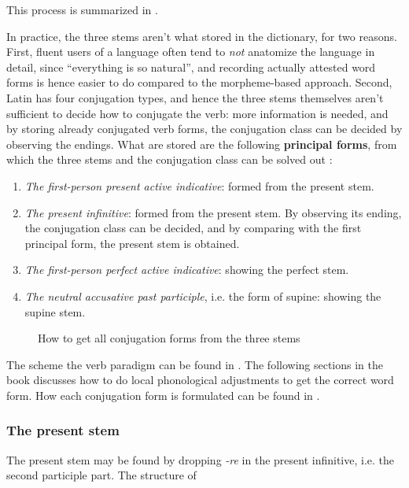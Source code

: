 \documentclass{article}
\newcommand*{\citesec}[1]{\S~{#1}}
\newcommand*{\concept}[1]{\textbf{#1}}
\newcommand*{\corpus}[1]{\emph{#1}}
\begin{document}
This process is summarized in .

In practice, the three stems aren't what stored in the dictionary,
for two reasons.
First, fluent users of a language often 
tend to \emph{not} anatomize the language in detail,
since ``everything is so natural'', 
and recording actually attested word forms is hence easier to do
compared to the morpheme-based approach.
Second, Latin has four conjugation types,
and hence the three stems themselves aren't sufficient to decide how to conjugate the verb:
more information is needed, 
and by storing already conjugated verb forms,
the conjugation class can be decided by observing the endings.
What are stored are the following \concept{principal forms},
from which the three stems and the conjugation class can be solved out
\citep[\citesec{172}]{allen1903allen}:
\begin{enumerate}
    \item \emph{The first-person present active indicative}: formed from the present stem.
    \item \emph{The present infinitive}: formed from the present stem. 
    By observing its ending, the conjugation class can be decided,
    and by comparing with the first principal form, 
    the present stem is obtained.
    \item \emph{The first-person perfect active indicative}: showing the perfect stem.
    \item \emph{The neutral accusative past participle}, i.e. the form of supine: showing the supine stem.
\end{enumerate}

\begin{sidewaysfigure}
    \centering
    
    \caption{How to get all conjugation forms from the three stems}
    \label{fig:stem-to-form}
\end{sidewaysfigure}

The scheme the verb paradigm can be found in \citep[\citesec{166}]{allen1903allen}.
The following sections in the book discusses how to do local phonological adjustments 
to get the correct word form.
How each conjugation form is formulated can be found in \citep[\citesec{180}]{allen1903allen}.

\subsubsection{The present stem}

The present stem may be found by dropping \corpus{-re} in the present infinitive, 
i.e. the second participle part.
The structure of 
\end{document}
